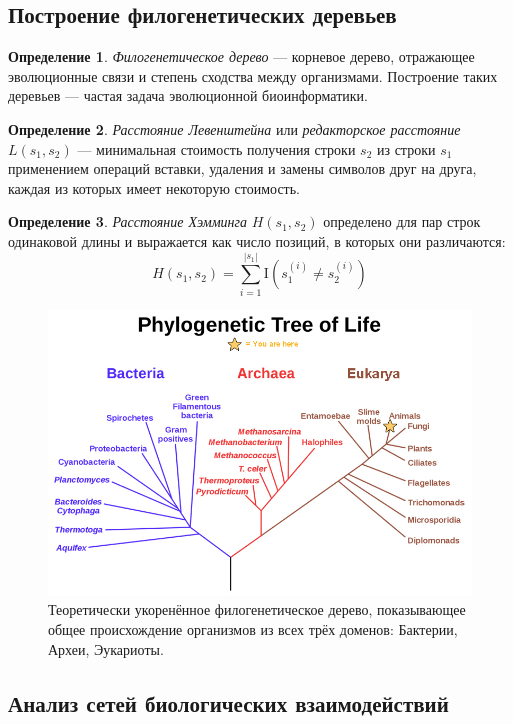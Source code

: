 \documentclass[11pt,a4paper]{report}
\theoremstyle{definition}
\theoremstyle{definition}
\theoremstyle{definition}
\newtheorem{definition}{Определение}[section]
\begin{document}
	\subsection{Построение филогенетических деревьев}
	\begin{definition}
		\textit{Филогенетическое дерево} — корневое дерево, отражающее эволюционные связи и степень сходства между организмами. Построение таких деревьев — частая задача эволюционной биоинформатики.
	\end{definition}
	\begin{definition}
		\textit{Расстояние Левенштейна} или \textit{редакторское расстояние} $ L(s_1, s_2) $ — минимальная стоимость получения строки $s_2$ из строки $s_1$ применением операций вставки, удаления и замены символов друг на друга, каждая из которых имеет некоторую стоимость. 
	\end{definition}
	\begin{definition}
		\textit{Расстояние Хэмминга} $ H(s_1, s_2) $ определено для пар строк одинаковой длины и выражается как число позиций, в которых они различаются: 
		$$
			H(s_1, s_2) = \sum_{i=1}^{|s_1|} \mathrm{I}\left (s_1^{(i)} \neq s_2^{(i)}\right )
		$$
	\end{definition} 
	\clearpage
	\begin{figure}[!hbtp]
		\includegraphics[width=\textwidth]{./img/phylogenetic_tree.jpg}
		\caption{Теоретически укоренённое филогенетическое дерево, показывающее общее происхождение организмов из всех трёх доменов: Бактерии, Археи, Эукариоты.}
	\end{figure}
	\subsection{Анализ сетей биологических взаимодействий}
\end{document}

